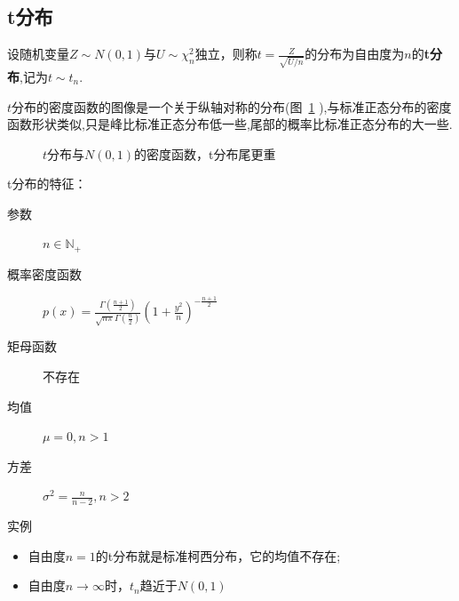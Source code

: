 \subsection{t分布}

\begin{definition}[t分布]
    设随机变量$Z \sim N(0,1)$与$U \sim\chi^2_n$独立，则称$t=\frac{Z}{\sqrt{U/n}}$的分布为自由度为$n$的\textbf{t分布},记为$t \sim t_n$.
\end{definition}

$t$分布的密度函数的图像是一个关于纵轴对称的分布(图~\ref{fig:5.4.3} ),与标准正态分布的密度函数形状类似,只是峰比标准正态分布低一些,尾部的概率比标准正态分布的大一些.
\begin{figure}
    \centering
    \caption{$t$分布与$N(0,1)$的密度函数，t分布尾更重}\label{fig:5.4.3}
\end{figure}

t分布的特征：
\begin{description}
    \item[参数] $n \in \mathbb{N}_+$
    \item[概率密度函数] $p(x)=\frac{\Gamma \left( \frac{n+1}{2} \right)}{\sqrt{n\pi}\Gamma \left( \frac{n}{2} \right)}\left( 1+\frac{y^2}{n} \right) ^{-\frac{n+1}{2}}$
    \item[矩母函数] 不存在
    \item[均值] $\mu=0, n>1$
    \item[方差] $\sigma^2=\frac{n}{n-2}, n>2$
    \item[实例]
\end{description}

\begin{remark}
    \begin{itemize}
        \item 自由度$n=1$的t分布就是标准柯西分布，它的均值不存在;
        \item 自由度$n\to \infty$时，$t_n$趋近于$N(0,1)$
    \end{itemize}
\end{remark}

